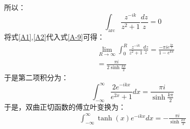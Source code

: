     所以：
    \begin{equation}\label{A2}
        \int_{\mathrm{arc}} \frac{z^{-ik}}{z^2+1}\frac{dz}{z} = 0
    \end{equation}
将式\ref{A1},\ref{A2}代入式\ref{A-9}可得：
\begin{equation}\label{}
    \begin{aligned}
    &\lim _{R \rightarrow \infty} \int_{0 }^{R }\frac{z^{-ik}}{z^2+1}\frac{dz}{z} = \frac{-\pi i e^{\frac{k\pi}{2}}}{1-e^{k\pi}}\\
    &= \frac{\pi i}{2\sinh\frac{k\pi}{2}}
\end{aligned}
\end{equation}
于是第二项积分为：
\begin{equation}\label{}
    \int_{-\infty }^{\infty } \frac{2e^{-ikx}}{e^{2x}+1} dx = \frac{\pi i}{\sinh\frac{k\pi}{2}}
\end{equation}
于是，双曲正切函数的傅立叶变换为：
\begin{equation}
    \begin{aligned}
      \int_{-\infty }^{\infty } \tanh (x)e^{-ikx}dx= -\frac{\pi i}{\sinh\frac{k\pi}{2}}
\end{aligned}
\end{equation}
